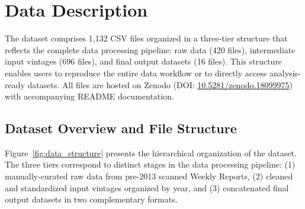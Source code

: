 \documentclass[12pt]{article}
\begin{document}
\section*{Data Description}


The dataset comprises 1,132 CSV files organized in a three-tier structure that reflects the complete data processing pipeline: raw data (420 files), intermediate input vintages (696 files), and final output datasets (16 files). This structure enables users to reproduce the entire data workflow or to directly access analysis-ready datasets. All files are hosted on Zenodo (DOI: \href{https://doi.org/10.5281/zenodo.18099975}{10.5281/zenodo.18099975}) with accompanying README documentation.

\subsection*{Dataset Overview and File Structure}

Figure~\ref{fig:data_structure} presents the hierarchical organization of the dataset. The three tiers correspond to distinct stages in the data processing pipeline: (1) manually-curated raw data from pre-2013 scanned Weekly Reports, (2) cleaned and standardized input vintages organized by year, and (3) concatenated final output datasets in two complementary formats.
\end{document}
